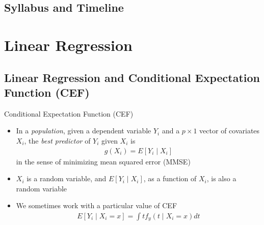 \documentclass[aspectratio=1610,12pt,xcolor=dvipsnames]{beamer}
\begin{document}
\subsection{Syllabus and Timeline}

\begin{frame}{}
\vspace{-1.4em}
\setlength{\tabcolsep}{1pt}
{\footnotesize}
\end{frame}

\section{Linear Regression}

\subsection*{Linear Regression and Conditional Expectation Function (CEF)}

\begin{frame}
  \subsectionpage
\end{frame}

\begin{frame}{Conditional Expectation Function (CEF)}
    \begin{itemize}
        \item In a \textit{population}, given a dependent variable $Y_i$ and a $p \times 1$ vector of covariates $X_i$, the \textit{best predictor} of $Y_i$ given $X_i$ is
        \begin{align*}
            g(X_i) = E[Y_i \mid X_i]
        \end{align*}
        in the sense of minimizing mean squared error (MMSE)
        \item $X_i$ is a random variable, and $E[Y_i \mid X_i]$, as a function of $X_i$, is also a random variable
        \item We sometimes work with a particular value of CEF
        \begin{align*}
            E[Y_i \mid X_i = x] = \int tf_y(t \mid X_i = x)dt
        \end{align*}
    \end{itemize}
\end{frame}
\end{document}
